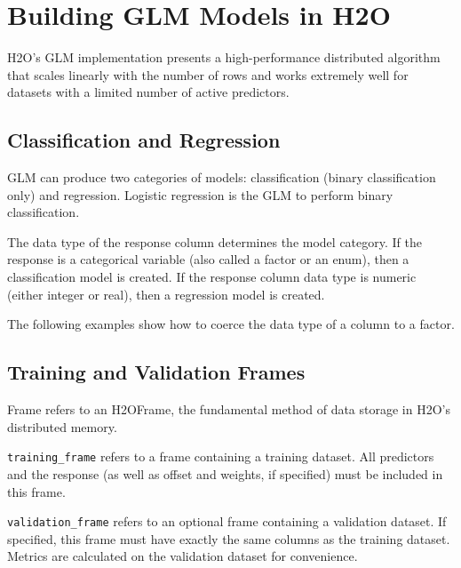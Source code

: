 
\section{Building GLM Models in H2O}

H2O's GLM implementation presents a high-performance distributed algorithm that scales linearly with the number
of rows and works extremely well for datasets with a limited number of active predictors.

\subsection{Classification and Regression}

GLM can produce two categories of models: classification (binary classification only) and regression. Logistic regression is the GLM to perform binary classification.

The data type of the response column determines the model category.  If the response is a categorical variable
(also called a factor or an enum), then a classification model is created.  If the response column data type is
numeric (either integer or real), then a regression model is created. 

The following examples show how to coerce the data type of a column to a factor.

\waterExampleInR


\waterExampleInPython


\subsection{Training and Validation Frames}

Frame refers to an H2OFrame, the fundamental method of data storage in H2O's distributed memory.

\texttt{training\_frame} refers to a frame containing a training dataset.  All predictors and the response (as
well as offset and weights, if specified) must be included in this frame.

\texttt{validation\_frame} refers to an optional frame containing a validation dataset.  If specified, this 
frame must have exactly the same columns as the training dataset.  Metrics are calculated on the validation dataset for convenience.

